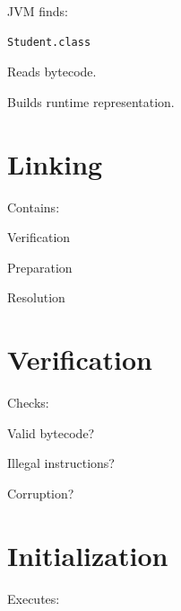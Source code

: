 \documentclass[11pt,a4paper]{book}
\begin{document}
JVM finds:

\begin{verbatim} 
Student.class
\end{verbatim}


Reads bytecode.


Builds runtime representation.


\section{Linking}

Contains:


Verification


Preparation


Resolution


\section{Verification}

Checks:


Valid bytecode?


Illegal instructions?


Corruption?


\section{Initialization}

Executes:
\end{document}
